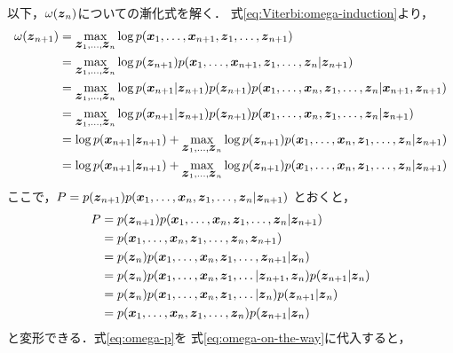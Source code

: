 以下，$\omega(\bvec{z}_n)$についての漸化式を解く．
式\eqref{eq:Viterbi:omega-induction}より，
\begin{align}
  \omega(\bvec{z}_{n+1}) &= \max_{\bvec{z}_1,\dots,\bvec{z}_n}\log p(\bvec{x}_1,\dots,\bvec{x}_{n+1},\bvec{z}_1,\dots,\bvec{z}_{n+1}) \\
  &= \max_{\bvec{z}_1,\dots,\bvec{z}_n}\log p(\bvec{z}_{n+1})p(\bvec{x}_1,\dots,\bvec{x}_{n+1},\bvec{z}_1,\dots,\bvec{z}_n|\bvec{z}_{n+1}) \\
  &= \max_{\bvec{z}_1,\dots,\bvec{z}_n}\log p(\bvec{x}_{n+1}|\bvec{z}_{n+1})p(\bvec{z}_{n+1})p(\bvec{x}_1,\dots,\bvec{x}_n,\bvec{z}_1,\dots,\bvec{z}_n|\bvec{x}_{n+1},\bvec{z}_{n+1}) \\
  &= \max_{\bvec{z}_1,\dots,\bvec{z}_n}\log p(\bvec{x}_{n+1}|\bvec{z}_{n+1})p(\bvec{z}_{n+1})p(\bvec{x}_1,\dots,\bvec{x}_n,\bvec{z}_1,\dots,\bvec{z}_n|\bvec{z}_{n+1}) \\
  &= \log p(\bvec{x}_{n+1}|\bvec{z}_{n+1})+\max_{\bvec{z}_1,\dots,\bvec{z}_n}\log p(\bvec{z}_{n+1})p(\bvec{x}_1,\dots,\bvec{x}_n,\bvec{z}_1,\dots,\bvec{z}_n|\bvec{z}_{n+1}) \\
  &= \log p(\bvec{x}_{n+1}|\bvec{z}_{n+1})+\max_{\bvec{z}_1,\dots,\bvec{z}_n}\log p(\bvec{z}_{n+1})p(\bvec{x}_1,\dots,\bvec{x}_n,\bvec{z}_1,\dots,\bvec{z}_n|\bvec{z}_{n+1}) \label{eq:omega-on-the-way}\\
\end{align}
ここで，$P = p(\bvec{z}_{n+1})p(\bvec{x}_1,\dots,\bvec{x}_n,\bvec{z}_1,\dots,\bvec{z}_n|\bvec{z}_{n+1})$
とおくと，
\begin{align}
  P &= p(\bvec{z}_{n+1})p(\bvec{x}_1,\dots,\bvec{x}_n,\bvec{z}_1,\dots,\bvec{z}_n|\bvec{z}_{n+1}) \\
  &= p(\bvec{x}_1,\dots,\bvec{x}_n,\bvec{z}_1,\dots,\bvec{z}_n,\bvec{z}_{n+1}) \\
  &= p(\bvec{z}_n)p(\bvec{x}_1,\dots,\bvec{x}_n,\bvec{z}_1,\dots,\bvec{z}_{n+1}|\bvec{z}_n) \\
  &= p(\bvec{z}_n)p(\bvec{x}_1,\dots,\bvec{x}_n,\bvec{z}_1,\dots|\bvec{z}_{n+1},\bvec{z}_n)p(\bvec{z}_{n+1}|\bvec{z}_n) \\
  &= p(\bvec{z}_n)p(\bvec{x}_1,\dots,\bvec{x}_n,\bvec{z}_1,\dots|\bvec{z}_n)p(\bvec{z}_{n+1}|\bvec{z}_n) \\
  &= p(\bvec{x}_1,\dots,\bvec{x}_n,\bvec{z}_1,\dots,\bvec{z}_n)p(\bvec{z}_{n+1}|\bvec{z}_n) \label{eq:omega-p}\\
\end{align}
と変形できる．式\eqref{eq:omega-p}を
式\eqref{eq:omega-on-the-way}に代入すると，

